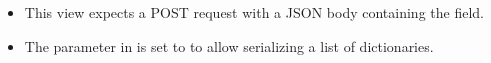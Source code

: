 \documentclass[letterpaper,10pt,english]{sphinxmanual}
\begin{document}
\begin{fulllineitems}
\begin{description}
\begin{itemize}
\item {} 
\sphinxAtStartPar
This view expects a POST request with a JSON body containing the  field.

\item {} 
\sphinxAtStartPar
The  parameter in  is set to  to allow serializing a list of dictionaries.

\end{itemize}

\end{description}

\end{fulllineitems}

\end{document}
